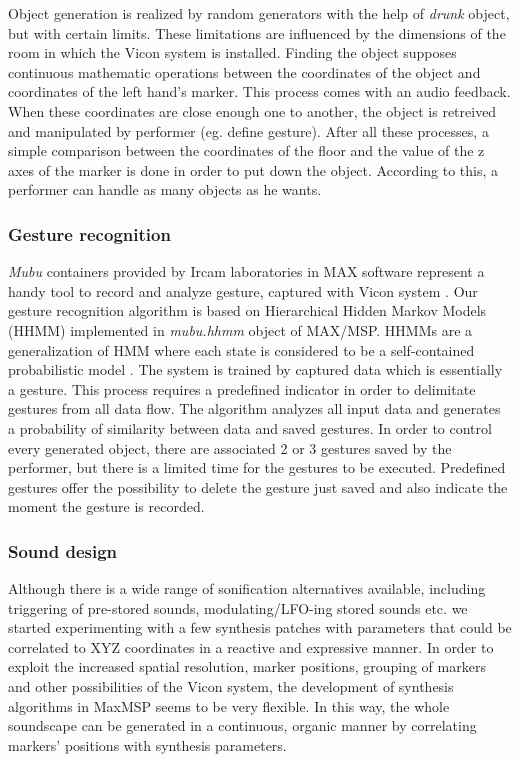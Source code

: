 \documentclass{nime-alternate}
\begin{document}
Object generation is realized by random generators with the help of \textit{drunk} object, but with certain limits. These limitations are influenced by the dimensions of the room in which the Vicon system is installed. Finding the object supposes continuous mathematic operations between the coordinates of the object and coordinates of the left hand's marker. This process comes with an audio feedback. When these coordinates are close enough one to another, the object is retreived and manipulated by performer (eg. define gesture). After all these processes, a simple comparison between the coordinates of the floor and the value of the z axes of the marker is done in order to put down the object. According to this, a performer can handle as many objects as he wants.\\ \par


\subsubsection{Gesture recognition}

 \textit{Mubu} containers provided by Ircam laboratories in MAX software represent a handy tool to record and analyze gesture, captured with Vicon system \cite{mubu}. Our gesture recognition algorithm is based on Hierarchical Hidden Markov Models (HHMM) implemented in \textit{mubu.hhmm} object of MAX/MSP. HHMMs are a generalization of HMM where each state is considered to be a self-contained probabilistic model \cite{hhmm}. The system is trained by captured data which is essentially a gesture. This process requires a predefined indicator in order to delimitate gestures from all data flow. The algorithm analyzes all input data and generates a probability of similarity between data and saved gestures. In order to control every generated object, there are associated 2 or 3 gestures saved by the performer, but there is a limited time for the gestures to be executed. Predefined gestures offer the possibility to delete the gesture just saved and also indicate the moment the gesture is recorded.

\subsubsection{Sound design}

Although there is a wide range of sonification alternatives available, including triggering of pre-stored sounds, modulating/LFO-ing stored sounds etc. we started experimenting with a few synthesis patches with parameters that could be correlated to XYZ coordinates in a reactive and expressive manner.  In order to exploit the increased spatial resolution, marker positions, grouping of markers and other possibilities of the Vicon system, the development of synthesis  algorithms in MaxMSP seems to be very flexible.  In this way, the whole soundscape can be generated in a continuous, organic manner by correlating markers’ positions with synthesis parameters. 
\end{document}

